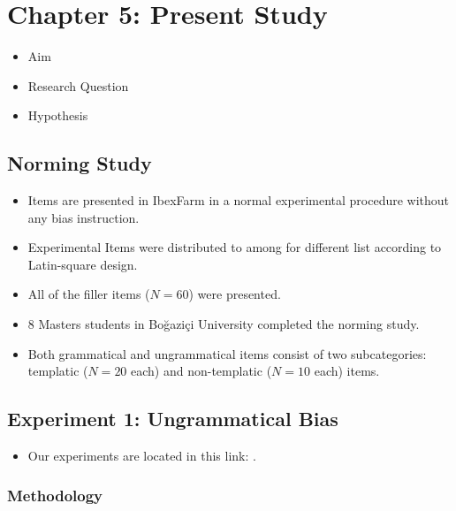 \documentclass[
  10pt,
  english,
  doc,floatsintext]{apa6}
\providecommand{\tightlist}{%
  \setlength{\itemsep}{0pt}\setlength{\parskip}{0pt}}
\begin{document}
\hypertarget{chapter-5-present-study}{%
\section{Chapter 5: Present Study}\label{chapter-5-present-study}}

\begin{itemize}
\tightlist
\item
  Aim
\item
  Research Question
\item
  Hypothesis
\end{itemize}

\hypertarget{norming-study}{%
\subsection{Norming Study}\label{norming-study}}

\begin{itemize}
\tightlist
\item
  Items are presented in IbexFarm in a normal experimental procedure without any bias instruction.
\item
  Experimental Items were distributed to among for different list according to Latin-square design.
\item
  All of the filler items (\(N=60\)) were presented.
\item
  8 Masters students in Boğaziçi University completed the norming study.
\item
  Both grammatical and ungrammatical items consist of two subcategories: templatic (\(N=20\) each) and non-templatic (\(N=10\) each) items.
\end{itemize}

\hypertarget{experiment-1-ungrammatical-bias}{%
\subsection{Experiment 1: Ungrammatical Bias}\label{experiment-1-ungrammatical-bias}}

\begin{itemize}
\tightlist
\item
  Our experiments are located in this link: \url{}.
\end{itemize}

\hypertarget{methodology}{%
\subsubsection{Methodology}\label{methodology}}
\end{document}
